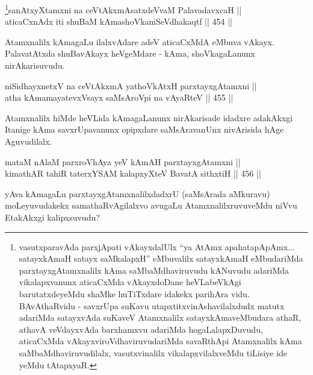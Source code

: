 \begin{shl}
\footnote{vasutxparavAda parxjApati vAkayxdalUlx ``ya AtAmx
apahatapApAmx... satayxkAmaH satayx saMkalapxH'' eMbuvalilx
satayxkAmaH eMbudariMda parxtayxgAtamxnalilx kAma saMbaMdhaviruvudu
kANuvudu adariMda vikalapxvanunx aticaCxMda vAkayxdoDane heVLabeVkAgi
barutatxdeyeMdu shaMke huTiTxdare idakekx parihAra vidu. BAvAthaRvidu -
savxrUpa suKavu utapxtitxvinAshavilalxdudx matutx adariMda satayxvAda
suKaveV Atamxnalilx satayxkAmaveMbudara athaR, athavA veVdayxvAda
barxhamxvu adariMda hogaLalapxDuvudu, aticaCxMda
vAkayxviroVdhaviruvudariMda savaRthApi Atamxnalilx kAma
saMbaMdhaviruvudilalx, vasutxvinalilx vikalapxvilalxveMdu tiLisiye ide
yeMdu tAtapxyaR.}sanAtxyXtamxni na ceVtAkxmAsatxdeVvaM PalavadavxcaH || \\
aticaCxnAdx iti shuBaM kAmashoVkaniSeVdhakaqtf \hfill || 454 ||  
\end{shl}

\begin{artha}
Atamxnalilx kAmagaLu ilalxvAdare adeV aticaCxMdA eMbuva
vAkayx. PalavatAtxda shuBavAkayx heVgeMdare - kAma, shoVkagaLanunx
nirAkarisuvudu.
\end{artha}


\begin{shl}
niSidhayxnetxV na ceVtAkxmA yathoVkAtxH parxtayxgAtamxni || \\
atha kAmamayatevxV\s sayx saMsAroV\s pi na vAyaRteV \hfill || 455 ||  
\end{shl}

\begin{artha}
Atamxnalilx hiMde heVLida kAmagaLanunx nirAkarisade idadxre
adakAkxgi Itanige kAma savxrUpavanunx opipxdare saMsAravanUnx
nivArisida hAge Aguvudilalx.
\end{artha}


\begin{shl}
mataM nAlaM parxroVhAya yeV kAmAH parxtayxgAtamxni || \\
kimathAR tahiR taterxYSAM kalapxyXteV BavatA sithxtiH \hfill || 456 ||  
\end{shl}

\begin{artha}
yAva kAmagaLu parxtayxgAtamxnalilxdadxrU (saMsArada aMkuravu)
moLeyuvudakekx samathaRvAgilalxvo avugaLu AtamxnalilxruvuveMdu niVvu
EtakAkxgi kalipxsuvudu?
\end{artha}

